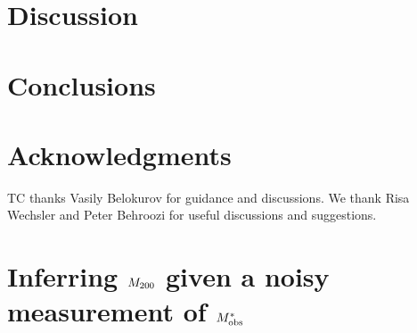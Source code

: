\documentclass[useAMS,usenatbib]{mn2e}
\begin{document}
\section{Discussion}
\label{sec:discuss}


\section{Conclusions}
\label{sec:conclude}


\section*{Acknowledgments}
 
TC thanks Vasily Belokurov for guidance and discussions.
We thank Risa Wechsler and Peter Behroozi for useful discussions and 
suggestions.



\appendix


\section{Inferring $M_{200}$ given a noisy measurement of $M^{*}_{\rm obs}$}
\label{appendix:MSMH}





% 

% 
% 




\label{lastpage}
\bsp
\end{document}
